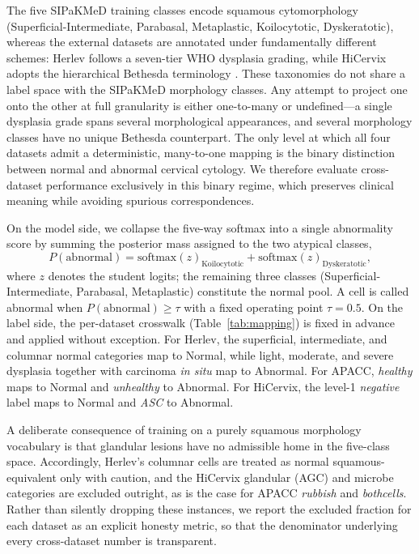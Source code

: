 \documentclass[twocolumn]{article}
\begin{document}
The five SIPaKMeD training classes encode squamous cytomorphology (Superficial-Intermediate, Parabasal, Metaplastic, Koilocytotic, Dyskeratotic), whereas the external datasets are annotated under fundamentally different schemes: Herlev follows a seven-tier WHO dysplasia grading, while HiCervix adopts the hierarchical Bethesda terminology \citep{nayar2015bethesda}. These taxonomies do not share a label space with the SIPaKMeD morphology classes. Any attempt to project one onto the other at full granularity is either one-to-many or undefined---a single dysplasia grade spans several morphological appearances, and several morphology classes have no unique Bethesda counterpart. The only level at which all four datasets admit a deterministic, many-to-one mapping is the binary distinction between normal and abnormal cervical cytology. We therefore evaluate cross-dataset performance exclusively in this binary regime, which preserves clinical meaning while avoiding spurious correspondences.

On the model side, we collapse the five-way softmax into a single abnormality score by summing the posterior mass assigned to the two atypical classes,
\begin{equation}
P(\text{abnormal}) = \mathrm{softmax}(z)_{\text{Koilocytotic}} + \mathrm{softmax}(z)_{\text{Dyskeratotic}},
\end{equation}
where $z$ denotes the student logits; the remaining three classes (Superficial-Intermediate, Parabasal, Metaplastic) constitute the normal pool. A cell is called abnormal when $P(\text{abnormal}) \geq \tau$ with a fixed operating point $\tau = 0.5$. On the label side, the per-dataset crosswalk (Table~\ref{tab:mapping}) is fixed in advance and applied without exception. For Herlev, the superficial, intermediate, and columnar normal categories map to Normal, while light, moderate, and severe dysplasia together with carcinoma \emph{in situ} map to Abnormal. For APACC, \emph{healthy} maps to Normal and \emph{unhealthy} to Abnormal. For HiCervix, the level-1 \emph{negative} label maps to Normal and \emph{ASC} to Abnormal.

A deliberate consequence of training on a purely squamous morphology vocabulary is that glandular lesions have no admissible home in the five-class space. Accordingly, Herlev's columnar cells are treated as normal squamous-equivalent only with caution, and the HiCervix glandular (AGC) and microbe categories are excluded outright, as is the case for APACC \emph{rubbish} and \emph{bothcells}. Rather than silently dropping these instances, we report the excluded fraction for each dataset as an explicit honesty metric, so that the denominator underlying every cross-dataset number is transparent.
\end{document}
